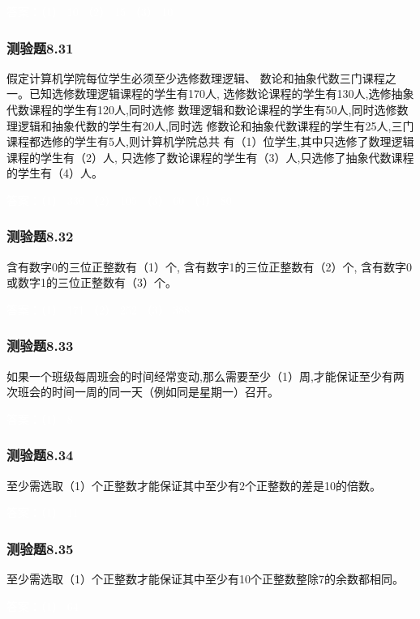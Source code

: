 \documentclass[UTF8, heading=true]{ctexart}
\begin{document}
\textcolor{white}{答案：（1） 10 （2） 15 （3） 10}

\subsubsection{测验题8.31}

假定计算机学院每位学生必须至少选修数理逻辑、
数论和抽象代数三门课程之一。已知选修数理逻辑课程的学生有170人,
选修数论课程的学生有130人,选修抽象代数课程的学生有120人,同时选修
数理逻辑和数论课程的学生有50人,同时选修数理逻辑和抽象代数的学生有20人,同时选
修数论和抽象代数课程的学生有25人,三门课程都选修的学生有5人,则计算机学院总共
有（1）位学生,其中只选修了数理逻辑课程的学生有（2）人,
只选修了数论课程的学生有（3）人,只选修了抽象代数课程的学生有（4）人。

\textcolor{white}{答案：（1） 330 （2） 105 （3） 60 （4） 80}


\subsubsection{测验题8.32}

含有数字0的三位正整数有（1）个,
含有数字1的三位正整数有（2）个,
含有数字0或数字1的三位正整数有（3）个。

\textcolor{white}{答案：（1） 171 （2） 252 （3） 388}

\subsubsection{测验题8.33}

如果一个班级每周班会的时间经常变动,那么需要至少（1）周,才能保证至少有两次班会的时间一周的同一天（例如同是星期一）召开。

\textcolor{white}{答案：（1） 8}


\subsubsection{测验题8.34}

至少需选取（1）个正整数才能保证其中至少有2个正整数的差是10的倍数。

\textcolor{white}{答案：（1） 11}

\subsubsection{测验题8.35}
至少需选取（1）个正整数才能保证其中至少有10个正整数整除7的余数都相同。

\textcolor{white}{答案：（1） 64}
\end{document}
